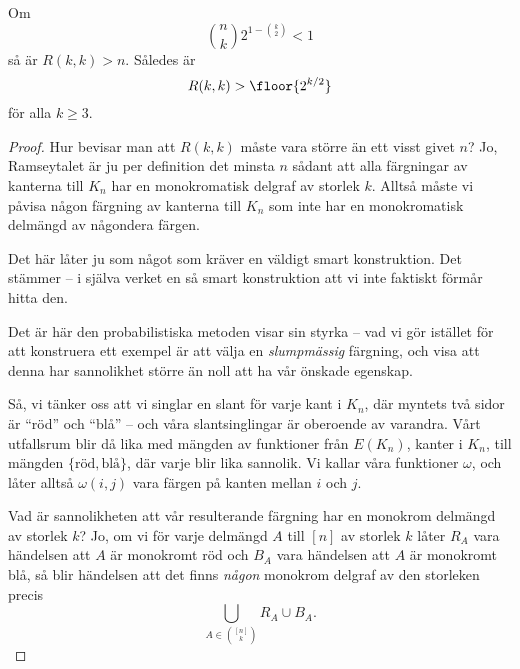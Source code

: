 \documentclass[nobib]{tufte-handout}
\begin{document}
\begin{proposition}\label{prop_ramsey_bound}
    Om
    $$\binom{n}{k}2^{1-\binom{k}{2}} < 1$$
    så är $R(k,k) > n$. Således är
    $$R(k,k) > \floor{2^{k/2}}$$
    för alla $k\geq 3$.

    \begin{proof}
        Hur bevisar man att $R(k,k)$ måste vara större än ett visst givet $n$? Jo, Ramseytalet är ju per definition det minsta $n$ sådant att alla färgningar av kanterna till $K_n$ har en monokromatisk delgraf av storlek $k$. Alltså måste vi påvisa någon färgning av kanterna till $K_n$ som inte har en monokromatisk delmängd av någondera färgen.

        Det här låter ju som något som kräver en väldigt smart konstruktion. Det stämmer -- i själva verket en så smart konstruktion att vi inte faktiskt förmår hitta den.

        Det är här den probabilistiska metoden visar sin styrka -- vad vi gör istället för att konstruera ett exempel är att välja en \emph{slumpmässig} färgning, och visa att denna har sannolikhet större än noll att ha vår önskade egenskap.

        Så, vi tänker oss att vi singlar en slant för varje kant i $K_n$, där myntets två sidor är ``röd'' och ``blå'' -- och våra slantsinglingar är oberoende av varandra. Vårt utfallsrum blir då lika med mängden av funktioner från $E(K_n)$, kanter i $K_n$, till mängden $\{\text{röd}, \text{blå}\}$, där varje blir lika sannolik. Vi kallar våra funktioner $\omega$, och låter alltså $\omega(i,j)$ vara färgen på kanten mellan $i$ och $j$.

        Vad är sannolikheten att vår resulterande färgning har en monokrom delmängd av storlek $k$? Jo, om vi för varje delmängd $A$ till $[n]$ av storlek $k$ låter $R_A$ vara händelsen att $A$ är monokromt röd och $B_A$ vara händelsen att $A$ är monokromt blå, så blir händelsen att det finns \emph{någon} monokrom delgraf av den storleken precis
        $$\bigcup_{A \in \binom{[n]}{k}} R_A \cup B_A.$$


\end{proof}
\end{proposition}
\end{document}
